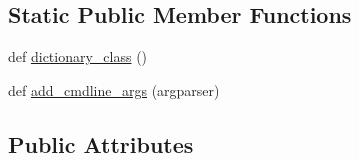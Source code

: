 \subsection*{Static Public Member Functions}
\begin{DoxyCompactItemize}
\item 
def \hyperlink{classparlai_1_1agents_1_1language__model_1_1language__model_1_1LanguageModelAgent_a80bdd18c28f4a2ab19c463dd123165e7}{dictionary\+\_\+class} ()
\item 
def \hyperlink{classparlai_1_1agents_1_1language__model_1_1language__model_1_1LanguageModelAgent_a935ed616ff38d97e918adb2345386631}{add\+\_\+cmdline\+\_\+args} (argparser)
\end{DoxyCompactItemize}
\subsection*{Public Attributes}
